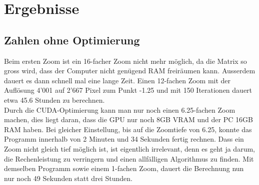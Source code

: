 \section{Ergebnisse}

\subsection{Zahlen ohne Optimierung}
Beim ersten Zoom ist ein 16-facher Zoom nicht mehr möglich, da die Matrix so gross wird, dass der Computer nicht genügend RAM freiräumen kann. Ausserdem dauert es dann schnell mal eine lange Zeit. Einen 12-fachen Zoom mit der Auflösung 4'001 auf 2'667 Pixel zum Punkt -1.25 und mit 150 Iterationen dauert etwa 45.6 Stunden zu berechnen.\\
Durch die CUDA-Optimierung kann man nur noch einen 6.25-fachen Zoom machen, dies liegt daran, dass die GPU nur noch 8GB VRAM und der PC 16GB RAM haben. Bei gleicher Einstellung, bis auf die Zoomtiefe von 6.25, konnte das Programm innerhalb von 2 Minuten und 34 Sekunden fertig rechnen. Dass ein Zoom nicht gleich tief möglich ist, ist eigentlich irrelevant, denn es geht ja darum, die Rechenleistung zu verringern und einen allfälligen Algorithmus zu finden. Mit demselben Programm sowie einem 1-fachen Zoom, dauert die Berechnung nun nur noch 49 Sekunden statt drei Stunden.

